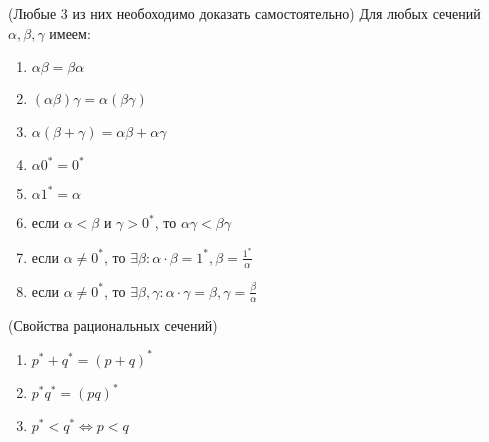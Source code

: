 \begin{theorem} (Любые 3 из них необоходимо доказать самостоятельно)
    Для любых сечений $\alpha, \beta, \gamma$ имеем:
    \begin{enumerate}
        \item $\alpha\beta = \beta\alpha$
        \item $(\alpha\beta)\gamma = \alpha(\beta\gamma)$
        \item $\alpha(\beta + \gamma) = \alpha\beta + \alpha\gamma$
        \item $\alpha0^* = 0^*$
        \item $\alpha1^* = \alpha$
        \item если $\alpha < \beta$ и $\gamma > 0^*$, то $\alpha\gamma < \beta\gamma$ 
        \item если $\alpha \neq 0^*$, то $\exists \beta: \alpha \cdot \beta = 1^*, \beta = \frac{1^*}{\alpha}$ 
        \item если $\alpha \neq 0^*$, то $\exists \beta, \gamma: \alpha \cdot \gamma = \beta, \gamma = \frac{\beta}{\alpha}$ 
    \end{enumerate}
\end{theorem}

\begin{theorem} (Свойства рациональных сечений)
    \begin{enumerate}
        \item $p^* + q^* = (p + q)^*$
        \item $p^*q^* = (pq)^*$
        \item $p^* < q^* \Leftrightarrow p < q$
    \end{enumerate}
\end{theorem}

